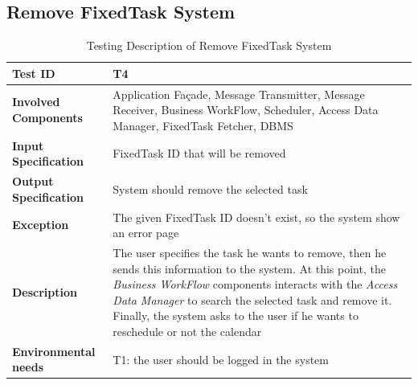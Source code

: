 \subsection*{Remove FixedTask System}

\begin{table}[H]
    \centering
    \begin{tabular}{p{4.55cm} p{7cm}}
        
        \hline
        
        \textbf{Test ID}                & T4 \\
        
        \hline
        
        \textbf{Involved Components}    & Application Façade, Message Transmitter, Message Receiver, Business                                          WorkFlow, Scheduler, Access Data Manager, FixedTask Fetcher, DBMS\\
        
        \hline
        
        \textbf{Input Specification}    & FixedTask ID that will be removed\\
        
        \hline
        
        \textbf{Output Specification}   & System should remove the selected task\\
        
        \hline
        
        \textbf{Exception}              & The given FixedTask ID doesn't exist, so the system show an error page\\
        
        \hline
        
        \textbf{Description}            & The user specifies the task he wants to remove, then he sends this information to the system. At this point, the \emph{Business WorkFlow} components interacts with the \emph{Access Data Manager} to search the selected task and remove it. Finally, the system asks to the user if he wants to reschedule or not the calendar\\
        \hline
        
        \textbf{Environmental needs}    & T1: the user should be logged in the system\\
        
        \hline
        
    \end{tabular}
    \caption{Testing Description of Remove FixedTask System}
\end{table}




